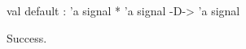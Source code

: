 \chklistingtrue
{}
\begin{ChkListingMsg}
val default : 'a signal * 'a signal -D-> 'a signal
\end{ChkListingMsg}
\begin{ChkListingErr}
Success.
\end{ChkListingErr}
